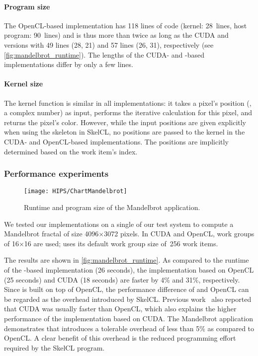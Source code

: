 \paragraph{Program size}
The OpenCL-based implementation has 118 lines of code (kernel: 28~lines, host program: 90~lines) and is thus more than twice as long as the CUDA and \SkelCL versions with 49 lines (28, 21) and 57 lines (26, 31), respectively (see \autoref{fig:mandelbrot_runtime}).
The lengths of the CUDA- and \SkelCL-based implementations differ by only a few lines.

\paragraph{Kernel size}
The kernel function is similar in all implementations: it takes a pixel's position (\ie, a complex number) as input, performs the iterative calculation for this pixel, and returns the pixel's color.
However, while the input positions are given explicitly when using the \map skeleton in SkelCL, no positions are passed to the kernel in the CUDA- and OpenCL-based implementations.
The positions are implicitly determined based on the work item's index.

\subsubsection*{Performance experiments}
\label{sec:mandelbrot:performance}

\begin{figure}[tb]
    \centering
    \texttt{[image: HIPS/ChartMandelbrot]}
    \caption{Runtime and program size of the Mandelbrot application.}
    \label{fig:mandelbrot_runtime}
\end{figure}%


We tested our implementations on a single \GPU of our test system to compute a Mandelbrot fractal of size 4096$\times$3072 pixels.
In CUDA and OpenCL, work groups of 16$\times$16 are used; \SkelCL uses its default work group size of~256 work items.

The results are shown in \autoref{fig:mandelbrot_runtime}.
As compared to the runtime of the \SkelCL-based implementation (26 seconds), the implementation based on OpenCL (25 seconds) and CUDA (18 seconds) are faster by 4\% and 31\%, respectively.
Since \SkelCL is built on top of OpenCL, the performance difference of \SkelCL and OpenCL can be regarded as the overhead introduced by SkelCL.
Previous work~\cite{KongDiYaLiCaStMaZh2010} also reported that CUDA was usually faster than OpenCL, which also explains the higher performance of the implementation based on CUDA.
The Mandelbrot application demonstrates that \SkelCL introduces a tolerable overhead of less than 5\% as compared to OpenCL.
A clear benefit of this overhead is the reduced programming effort required by the SkelCL program.

